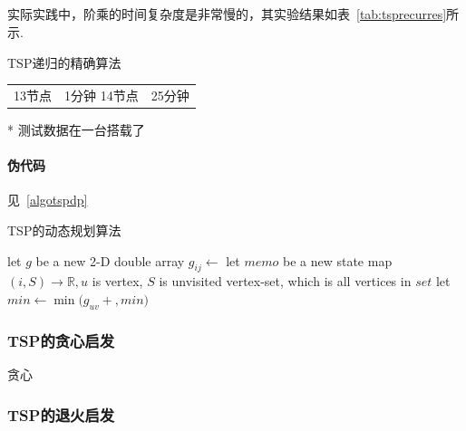 \documentclass[UTF8,a4paper]{ctexart}
\begin{document}
\subparagraph{}实际实践中，阶乘的时间复杂度是非常慢的，其实验结果如表~\ref{tab:tsprecurres}所示.
\begin{threeparttable}[htbp]
    \caption{TSP递归的精确算法}\label{tab:tsprecurres}
    \centering
    \begin{tabular}{ll}
        13节点 & 1分钟
        14节点 & 25分钟
    \end{tabular}
    \begin{tablenotes}
        \footnotesize
        \item[*] 测试数据在一台搭载了
    \end{tablenotes}
\end{threeparttable}

\paragraph{伪代码}见~\ref{algotspdp}
\begin{algorithm}
    \caption{TSP的动态规划算法}\label{algotspdp}
    \begin{algorithmic}[1] %
        \State let {$g$} be a new 2-D double array
        \State {}
        \State $g_{ij}\gets $
        \EndFor
        \EndFor
        \State let {$memo$} be a new state map {$(i,S)\to \mathbb{R},u$ is vertex, $S$ is unvisited vertex-set, which is all vertices in $set$}
        \EndFor
        \EndFunction
        \State
        \State {}
        \EndIf
        \State let {$min \gets \min(g_{uv}+$$,min)$}
        \EndFor
        \State {}
        \EndFunction
    \end{algorithmic}
\end{algorithm}


\subsubsection{TSP的贪心启发}
贪心

\subsubsection{TSP的退火启发}
\end{document}
